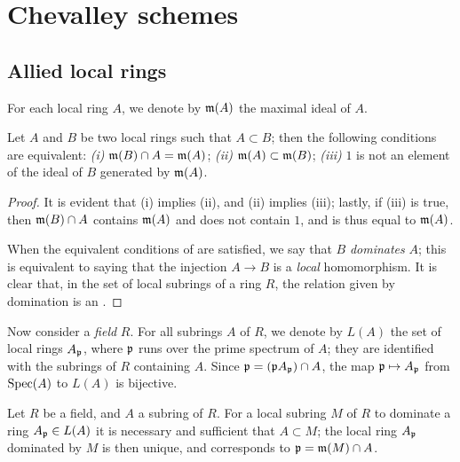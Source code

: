 \section{Chevalley schemes}
\label{section-chevalley-schemes}

\subsection{Allied local rings}
\label{subsection-allied-local-rings}

For each local ring $A$, we denote by $\mathfrak{m}(A)$ the maximal ideal of
$A$.

\begin{lem}[8.1.1]
\label{1.8.1.1}
Let $A$ and $B$ be two local rings such that $A\subset B$;
then the following conditions are equivalent: \emph{(i)}
$\mathfrak{m}(B)\cap A=\mathfrak{m}(A)$; \emph{(ii)}
$\mathfrak{m}(A)\subset\mathfrak{m}(B)$; \emph{(iii)} $1$ is not an element of
the ideal of $B$ generated by $\mathfrak{m}(A)$.
\end{lem}

\begin{proof}
\label{proof-1.8.1.1}
It is evident that (i) implies (ii), and (ii) implies (iii); lastly, if (iii) is
true, then $\mathfrak{m}(B)\cap A$ contains $\mathfrak{m}(A)$ and does not
contain $1$, and is thus equal to $\mathfrak{m}(A)$.

When the equivalent conditions of  are satisfied, we say that $B$
\emph{dominates} $A$; this is equivalent to saying that the injection $A\to B$
is a \emph{local} homomorphism. It is clear that, in the set of local subrings
of a ring $R$, the relation given by domination is an .
\end{proof}

\begin{env}[8.1.2]
\label{1.8.1.2}
Now consider a \emph{field} $R$. For all subrings $A$ of
$R$, we denote by $L(A)$ the set of local rings $A_\mathfrak{p}$, where
$\mathfrak{p}$ runs over the prime spectrum of $A$; they are identified with the
subrings of $R$ containing $A$. Since
$\mathfrak{p}=(\mathfrak{p}A_\mathfrak{p})\cap A$, the map
$\mathfrak{p}\mapsto A_\mathfrak{p}$ from ${\mathop{\mathrm{Spec}}\nolimits}(A)$ to $L(A)$ is bijective.
\end{env}

\begin{lem}[8.1.3]
\label{1.8.1.3}
Let $R$ be a field, and $A$ a subring of $R$. For a
local subring $M$ of $R$ to dominate a ring $A_\mathfrak{p}\in L(A)$ it is
necessary and sufficient that $A\subset M$; the local ring $A_\mathfrak{p}$
dominated by $M$ is then unique, and corresponds to
$\mathfrak{p}=\mathfrak{m}(M)\cap A$.
\end{lem}


